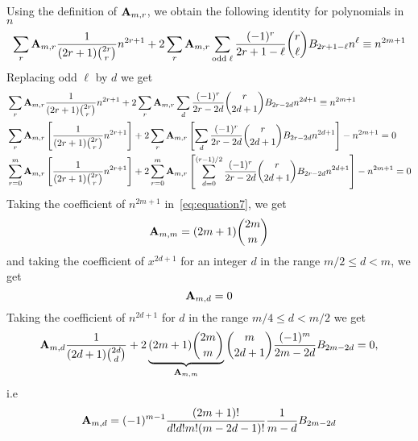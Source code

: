 Using the definition of ${\mathbf{A}} \sb{m,r}$, we obtain the following identity for polynomials in $n$
\begin{equation}
    \label{eq:equation}
    \sum_{r} {\mathbf{A}} \sb{m,r} \frac{1}{(2r+1) \binom{2r}r} n^{2r+1}
    + 2 \sum_{r} {\mathbf{A}} \sb{m,r} \sum_{\mathrm{odd \; \ell}} \frac{(-1)^r}{2r+1-\ell} \binom{r}{\ell} {B}\sb{2r+1-\ell} n^{\ell}
    \equiv n^{2m+1}
\end{equation}
Replacing odd $\ell$ by $d$ we get
\begin{equation}
    \begin{split}
        &\sum_{r} {\mathbf{A}} \sb{m,r} \frac{1}{(2r+1) \binom{2r}r} n^{2r+1}
        + 2 \sum_{r} {\mathbf{A}} \sb{m,r} \sum_{d} \frac{(-1)^r}{2r-2d} \binom{r}{2d+1} {B}\sb{2r-2d} n^{2d+1}
        \equiv n^{2m+1} \\
        &\sum_{r} {\mathbf{A}} \sb{m,r} \left[ \frac{1}{(2r+1) \binom{2r}r} n^{2r+1} \right]
        + 2 \sum_{r} {\mathbf{A}} \sb{m,r} \left[ \sum_{d} \frac{(-1)^r}{2r-2d} \binom{r}{2d+1} {B}\sb{2r-2d} n^{2d+1} \right]
        - n^{2m+1} = 0 \\
        &\sum_{r=0}^{m} {\mathbf{A}} \sb{m,r} \left[ \frac{1}{(2r+1) \binom{2r}r} n^{2r+1} \right]
        + 2 \sum_{r=0}^{m} {\mathbf{A}} \sb{m,r} \left[ \sum_{d=0}^{(r-1)/2} \frac{(-1)^r}{2r-2d} \binom{r}{2d+1} {B}\sb{2r-2d} n^{2d+1} \right]
        - n^{2m+1} = 0 \\
    \end{split}\label{eq:equation7}
\end{equation}
Taking the coefficient of $n^{2m+1}$ in~\eqref{eq:equation7}, we get
\begin{equation}
    {\mathbf{A}} \sb{m,m} = (2m+1)\binom{2m}{m}\label{eq:equation8}
\end{equation}
and taking the coefficient of $x^{2d+1}$ for an integer $d$ in the range $m/2 \leq d < m$, we get
\begin{equation}
    {\mathbf{A}} \sb{m,d} = 0\label{eq:equation9}
\end{equation}
Taking the coefficient of $n^{2d+1}$ for $d$ in the range $m/4 \leq d < m/2$ we get
\begin{equation}
    {\mathbf{A}} \sb{m,d} \frac{1}{(2d+1) \binom{2d}{d}}
    +2 \underbrace{(2m+1) \binom{2m}{m}}_{{\mathbf{A}} \sb{m,m}} \binom{m}{2d+1} \frac{(-1)^m}{2m-2d} {B}\sb{2m-2d} = 0,\label{eq:equation10}
\end{equation}
i.e
\begin{equation}
    {\mathbf{A}} \sb{m,d} = (-1)^{m-1} \frac{(2m+1)!}{d!d!m!(m-2d-1)!} \frac{1}{m-d} {B}\sb{2m-2d}\label{eq:equation11}
\end{equation}
